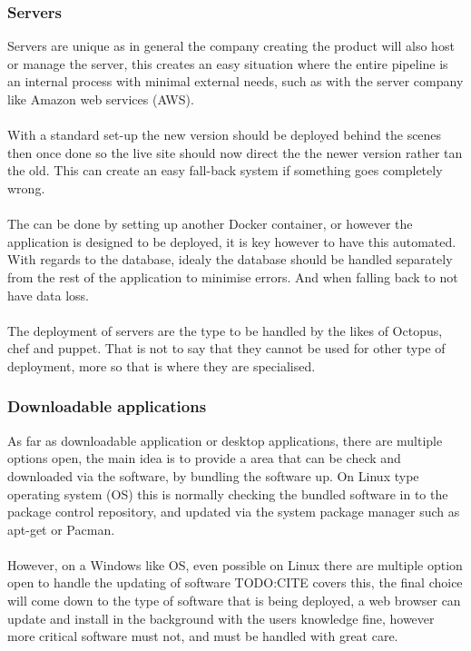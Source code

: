 \subsubsection{Servers}

Servers are unique as in general the company creating the product will also host or manage the server, this creates an easy situation where the entire pipeline is an internal process with minimal external needs, such as with the server company like Amazon web services (AWS).
\\\\
With a standard set-up the new version should be deployed behind the scenes then once done so the live site should now direct the the newer version rather tan the old. This can create an easy fall-back system if something goes completely wrong.
\\\\
The can be done by setting up another Docker container, or however the application is designed to be deployed, it is key however to have this automated. With regards to the database, idealy the database should be handled separately from the rest of the application to minimise errors. And when falling back to not have data loss.
\\\\
The deployment of servers are the type to be handled by the likes of Octopus, chef and puppet. That is not to say that they cannot be used for other type of deployment, more so that is where they are specialised.

\subsubsection{Downloadable applications}

As far as downloadable application or desktop applications, there are multiple options open, the main idea is to provide a area that can be check and downloaded via the software, by bundling the software up. On Linux type operating system (OS) this is normally checking the bundled software in to the package control repository, and updated via the system package manager such as apt-get or Pacman. 
\\\\
However, on a Windows like OS, even possible on Linux there are multiple option open to handle the updating of software TODO:CITE covers this, the final choice will come down to the type of software that is being deployed, a web browser can update and install in the background with the users knowledge fine, however more critical software must not, and must be handled with great care.

